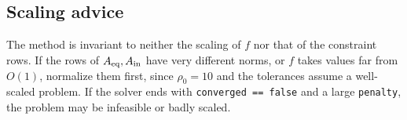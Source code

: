\subsection{Scaling advice}
The method is invariant to neither the scaling of $f$ nor that of the
constraint rows. If the rows of $A_{\mathrm{eq}},A_{\mathrm{in}}$ have very different norms, or $f$
takes values far from $O(1)$, normalize them first, since $\rho_0=10$ and
the tolerances assume a well-scaled problem. If the solver ends with
\texttt{converged == false} and a large \texttt{penalty}, the problem may be
infeasible or badly scaled.

